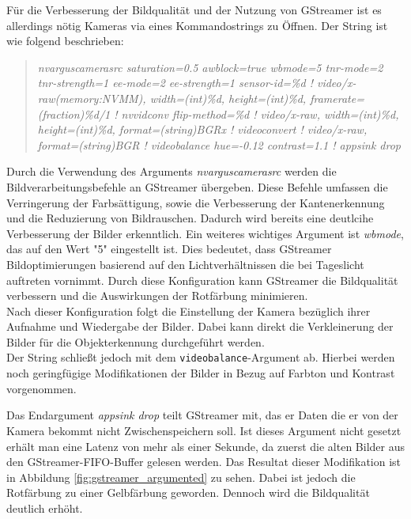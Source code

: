 Für die Verbesserung der Bildqualität und der Nutzung von GStreamer ist es allerdings nötig Kameras via eines Kommandostrings zu Öffnen. Der String ist wie folgend beschrieben:

\begin{quote}
    \textit{nvarguscamerasrc saturation=0.5 awblock=true wbmode=5 tnr-mode=2 tnr-strength=1  ee-mode=2 ee-strength=1 sensor-id=\%d !
        video/x-raw(memory:NVMM), width=(int)\%d, height=(int)\%d, framerate=(fraction)\%d/1 !
        nvvidconv flip-method=\%d ! 
        video/x-raw, width=(int)\%d, height=(int)\%d, format=(string)BGRx ! 
        videoconvert ! 
        video/x-raw, format=(string)BGR ! 
        videobalance hue=-0.12 contrast=1.1 ! appsink drop}
\end{quote}

Durch die Verwendung des Arguments \textit{nvarguscamerasrc} werden die Bildverarbeitungsbefehle an GStreamer übergeben. Diese Befehle umfassen die Verringerung der Farbsättigung, sowie die Verbesserung der Kantenerkennung und die Reduzierung von Bildrauschen. Dadurch wird bereits eine deutlcihe Verbesserung der Bilder erkenntlich. Ein weiteres wichtiges Argument ist \textit{wbmode}, das auf den Wert "5" eingestellt ist. Dies bedeutet, dass GStreamer Bildoptimierungen basierend auf den Lichtverhältnissen die bei Tageslicht auftreten vornimmt. Durch diese Konfiguration kann GStreamer die Bildqualität verbessern und die Auswirkungen der Rotfärbung minimieren.\\
Nach dieser Konfiguration folgt die Einstellung der Kamera bezüglich ihrer Aufnahme und Wiedergabe der Bilder. Dabei kann direkt die Verkleinerung der Bilder für die Objekterkennung durchgeführt werden.
\\
Der String schließt jedoch mit dem \texttt{videobalance}-Argument ab. Hierbei werden noch geringfügige Modifikationen der Bilder in Bezug auf Farbton und Kontrast vorgenommen.

Das Endargument \textit{appsink drop} teilt GStreamer mit, das er Daten die er von der Kamera bekommt nicht Zwischenspeichern soll. Ist dieses Argument nicht gesetzt erhält man eine Latenz von mehr als einer Sekunde, da zuerst die alten Bilder aus den GStreamer-FIFO-Buffer gelesen werden. Das Resultat dieser Modifikation ist in Abbildung \ref{fig:gstreamer_argumented} zu sehen. Dabei ist jedoch die Rotfärbung zu einer Gelbfärbung geworden. Dennoch wird die Bildqualität deutlich erhöht.

